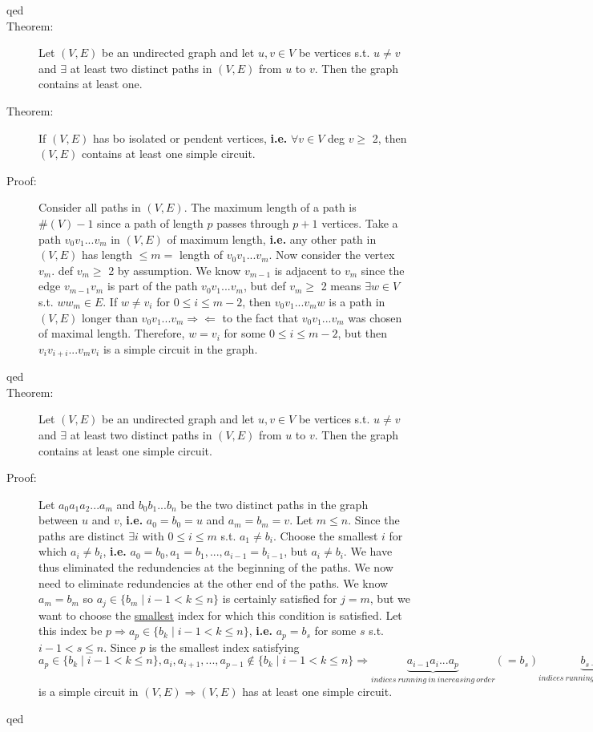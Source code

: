 \documentclass[10pt]{article}
\begin{document}
\begin{description}
		\item[qed]
		\item[Theorem:] Let $(V, E)$ be an undirected graph and let $u, v \in V$ be vertices s.t. $u \neq v$ and $\exists$ at least two distinct paths in $(V, E)$ from $u$ to $v$. Then the graph contains at least one.
		\item[Theorem:] If $(V, E)$ has bo isolated or pendent vertices, \textbf{i.e.} $\forall v \in V$ deg $v \geq$ 2, then $(V, E)$ contains at least one simple circuit.
		\item[Proof:] Consider all paths in $(V, E)$. The maximum length of a path is $\#(V)-1$ since a path of length $p$ passes through $p+1$ vertices. Take a path $v_0 v_1 ... v_m$ in $(V, E)$ of maximum length, \textbf{i.e.} any other path in $(V, E)$ has length $\leq m =$ length of $v_0 v_1 ... v_m$. Now consider the vertex $v_m$. def $v_m \geq $ 2 by assumption. We know $v_{m-1}$ is adjacent to $v_m$ since the edge $v_{m-1} v_m$ is part of the path $v_0 v_1 ... v_m$, but def $v_m \geq$ 2 means $\exists w \in V$ s.t. $ww_m \in E$. If $w \neq v_i$ for $0 \leq i \leq m-2$, then $v_0 v_1 ... v_m w$ is a path in $(V, E)$ longer than $v_0 v_1 ... v_m \Rightarrow \Leftarrow$ to the fact that $v_0 v_1 ... v_m$ was chosen of maximal length. Therefore, $w = v_i$ for some $0 \leq i \leq m-2$, but then $v_i v_{i+i}...v_m v_i$ is a simple circuit in the graph.
		\item[qed]
		\item[Theorem:] Let $(V, E)$ be an undirected graph and let $u, v \in V$ be vertices s.t. $u \neq v$ and $\exists$ at least two distinct paths in $(V, E)$ from $u$ to $v$. Then the graph contains at least one simple circuit.
		\item[Proof:] Let $a_0 a_1 a_2 ... a_m$ and $b_0 b_1 ... b_n$ be the two distinct paths in the graph between $u$ and $v$, \textbf{i.e.} $a_0 = b_0 = u$ and $a_m = b_m = v$. Let $m \leq n$. Since the paths are distinct $\exists i$ with $0 \leq i \leq m$ s.t. $a_1 \neq b_i$. Choose the smallest $i$ for which $a_i \neq b_i$, \textbf{i.e.} $a_0 = b_0, a_1 = b_1, ..., a_{i-1} = b_{i-1}$, but $a_i \neq b_i$. We have thus eliminated the redundencies at the beginning of the paths. We now need to eliminate redundencies at the other end of the paths. We know $a_m = b_m$ so $a_j \in \{b_m \mid i-1 < k \leq n \}$ is certainly satisfied for $j=m$, but we want to choose the \underline{smallest} index for which this condition is satisfied. Let this index be $p \Rightarrow a_p \in \{b_k \mid i-1 < k \leq n \}$, \textbf{i.e.} $a_p = b_s$ for some $s$ s.t. $i-1 < s \leq n$. Since $p$ is the smallest index satisfying $a_p \in \{b_k \mid i-1 < k \leq n \}, a_i, a_{i+1}, ..., a_{p-1} \notin \{b_k \mid i-1 < k \leq n \} \Rightarrow \underset{indices \: running \: in \: increasing \: order}{\underbrace{a_{i-1} a_i ... a_p}} (= b_s) \underset{indices \: running \: in \: decreasing \: order}{\underbrace{b_{s-1}...b_i}} a_{i-1} (=b_{i-1})$ is a simple circuit in $(V, E) \Rightarrow (V, E)$ has at least one simple circuit.
		\item[qed]
	\end{description}
	
\end{document}
